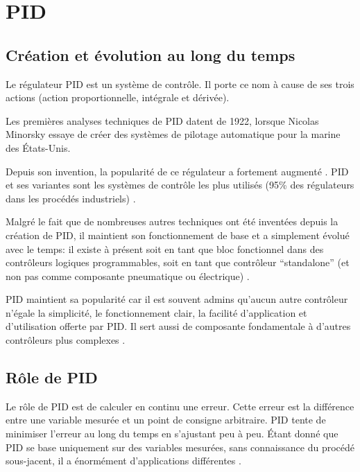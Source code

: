 
\section{PID}

\subsection{Création et évolution au long du temps}

Le régulateur PID est un système de contrôle.
Il porte ce nom à cause de ses trois actions (action proportionnelle, intégrale et dérivée).

Les premières analyses techniques de PID datent de 1922, lorsque Nicolas Minorsky essaye de créer des systèmes de pilotage automatique pour la marine des États-Unis. \cite{minorsky1922directional}

Depuis son invention, la popularité de ce régulateur a fortement augmenté \cite{ang2005pid}.
PID et ses variantes sont les systèmes de contrôle les plus utilisés (95\% des régulateurs dans les procédés industriels) \cite{Kinnaert2013} \cite{Astrom2002}.

Malgré le fait que de nombreuses autres techniques ont été inventées depuis la création de PID, il maintient son fonctionnement de base et a simplement évolué avec le temps:
il existe à présent soit en tant que bloc fonctionnel dans des contrôleurs logiques programmables, soit en tant que contrôleur ``standalone'' (et non pas comme composante pneumatique ou électrique) \cite{visioli2006practical}.

PID maintient sa popularité car il est souvent admins qu'aucun autre contrôleur n'égale la simplicité, le fonctionnement clair, la facilité d'application et d'utilisation offerte par PID.
Il sert aussi de composante fondamentale à d'autres contrôleurs plus complexes \cite{ang2005pid} \cite{visioli2006practical}.

\subsection{Rôle de PID}

Le rôle de PID est de calculer en continu une erreur.
Cette erreur est la différence entre une variable mesurée et un point de consigne arbitraire.
PID tente de minimiser l'erreur au long du temps en s'ajustant peu à peu.
Étant donné que PID se base uniquement sur des variables mesurées, sans connaissance du procédé sous-jacent, il a énormément d'applications différentes \cite{bennett1993history}.

